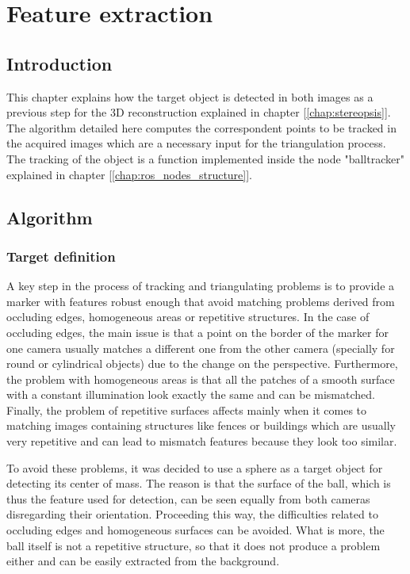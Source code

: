 \chapter{Feature extraction} %
\label{chap:feature_extraction}
\section{Introduction}
This chapter explains how the target object is detected in both images as a previous step for the 3D reconstruction explained in chapter [\ref{chap:stereopsis}]. The algorithm detailed here computes the correspondent points to be tracked in the acquired images which are a necessary input for the triangulation process.
The tracking of the object is a function implemented inside the node "balltracker" explained in chapter [\ref{chap:ros_nodes_structure}].

\section{Algorithm}

\subsection{Target definition}
A key step in the process of tracking and triangulating problems is to provide a marker with features robust enough that avoid matching problems derived from occluding edges, homogeneous areas or repetitive structures.
In the case of occluding edges, the main issue is that a point on the border of the marker for one camera usually matches a different one from the other camera (specially for round or cylindrical objects) due to the change on the perspective.
Furthermore, the problem with homogeneous areas is that all the patches of a smooth surface with a constant illumination look exactly the same and can be mismatched.
Finally, the problem of repetitive surfaces affects mainly when it comes to matching images containing structures like fences or buildings which are usually very repetitive and can lead to mismatch features because they look too similar.

To avoid these problems, it was decided to use a sphere as a target object for detecting its center of mass.
The reason is that the surface of the ball, which is thus the feature used for detection, can be seen equally from both cameras disregarding their orientation.
Proceeding this way, the difficulties related to occluding edges and homogeneous surfaces can be avoided.
What is more, the ball itself is not a repetitive structure, so that it does not produce a problem either and can be easily extracted from the background.

